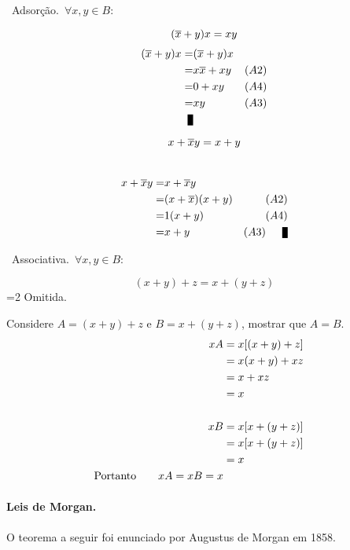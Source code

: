 ~Adsorção.~$\forall x,y \in B : $

\begin{minipage}{.5\textwidth}
$$(\~x\+ y)x=xy$$
\proof
\begin{eqnarray*}
(\~x\+ y)x =& (\~x\+ y)x &\hfill\\
  =&  x\~x + xy & (A2)\\
  =&  0 + xy & (A4)\\
   =& xy & (A3) \\
\qed\\
\end{eqnarray*}
\end{minipage}
\begin{minipage}{.5\textwidth}
$$x+\~xy=x+y$$\\
\begin{eqnarray*}
x \+\~xy= & x \+ \~xy& \hfill\\
 = & (x \+ \~x) (x \+ y) & (A2)\\
 = & 1(x\+ y) & (A4)\\
 = & x \+ y & (A3)\qed\\
\end{eqnarray*}
\end{minipage}

~Associativa.~$\forall x,y \in B :$

$$(x+y)+z=x+(y+z)$$
=2 %
\proof Omitida.
\begin{center}
\noindent Considere $A=(x+y)+z$ e $B=x+(y+z)$, mostrar que $A=B$.
\begin{eqnarray*}
  xA & = x[(x\+y)\+z] &\\
  & = x(x\+y)\+xz &\\
  & = x\+xz &\\
  & = x &\\
 & &\\
xB & = x[x\+(y\+z)] &\\
   & = x[x\+(y\+z)] &\\
   & = x &\\
\noindent{\rm Portanto}\qquad xA=xB=x\\
\end{eqnarray*}
\end{center}
\fi

\pagebreak
\paragraph{Leis de Morgan.}O teorema a seguir foi enunciado por
Augustus de Morgan em 1858.

